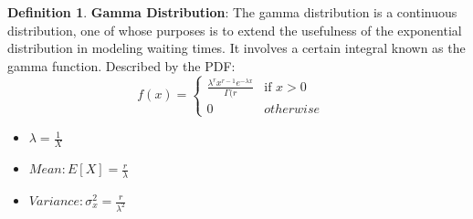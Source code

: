 \documentclass[12pt]{amsart}
\theoremstyle{definition}
\newtheorem{definition}{Definition} %
\numberwithin{equation}{theorem}    %
\begin{document}
\begin{definition}
    \textbf{Gamma Distribution}:
    The gamma distribution is a continuous distribution, one of whose purposes is to extend the usefulness of the exponential distribution in modeling waiting times. It involves a certain integral known as the gamma function. 
    Described by the PDF:
    $$f(x) = \begin{cases}
        \frac{\lambda^rx^{r-1}e^{-\lambda x}}{\Gamma(r} & \text{if } x > 0 \\
        0  & otherwise
  \end{cases} \quad$$
  \begin{itemize}
    \item $\lambda = \frac{1}{X}$
    \item $Mean:E[X] = \frac{r}{\lambda}$
    \item $Variance: \sigma_x^2 = \frac{r}{\lambda^2}$
\end{itemize}
\end{definition}
\end{document}
